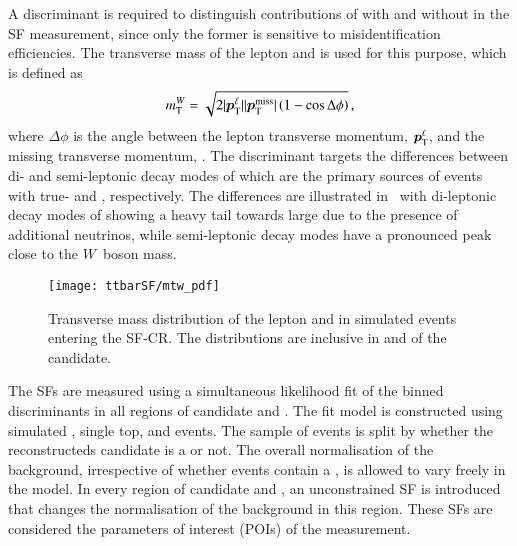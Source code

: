 A discriminant is required to distinguish contributions of \ttbar with and
without \faketauhadvis in the SF measurement, since only the former is sensitive
to \jettotauhadvis misidentification efficiencies. The transverse mass of the
lepton and \pTmissAbs is used for this purpose, which is defined as
\begin{align*}
  m_{\text{T}}^W = \sqrt{2 | \bm{p}_{\text{T}}^{\ell} | | \bm{p}_{\text{T}}^{\text{miss}} | \left( 1 - \cos \Delta\phi \right)} \,\text{,}
\end{align*}
where $\Delta \phi$ is the angle between the lepton transverse momentum,
$\bm{p}_{\text{T}}^{\ell}$, and the missing transverse momentum, \pTmiss. The
\mTW discriminant targets the differences between di- and semi-leptonic decay
modes of \ttbar which are the primary sources of events with true- and
\faketauhadvis, respectively. The differences are illustrated
in~ with di-leptonic decay modes of \ttbar showing a
heavy tail towards large \mTW due to the presence of additional neutrinos, while
semi-leptonic decay modes have a pronounced peak close to the $W$~boson mass.


\begin{figure}[htbp]
  \centering

  \texttt{[image: ttbarSF/mtw\_pdf]}

  \caption{Transverse mass distribution of the lepton and \pTmiss in simulated
    \ttbar events entering the SF-CR. The distributions are inclusive in \pT and
    \Ntracks of the \tauhadvis candidate.}%
  \label{fig:ttbarsf_mtw_pdf}
\end{figure}

The \faketauhadvis SFs are measured using a simultaneous likelihood fit of the
binned \mTW discriminants in all regions of \tauhadvis candidate \pT and
\Ntracks. The fit model is constructed using simulated \ttbar, single top, and
\Vjets events. The sample of \ttbar events is split by whether the
reconstructeds \tauhadvis candidate is a \faketauhadvis or not. The overall
normalisation of the \ttbar background, irrespective of whether events contain a
\faketauhadvis, is allowed to vary freely in the model.  In every region of
\tauhadvis candidate \Ntracks and \pT, an unconstrained SF is introduced that
changes the normalisation of the \ttbarFakes background in this region. These
\faketauhadvis SFs are considered the parameters of interest (POIs) of the
measurement.

